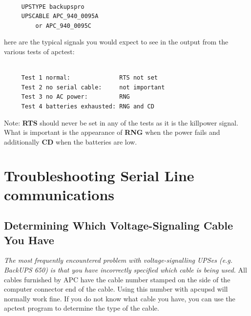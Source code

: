 {{{{{{{{{{\footnotesize
\begin{verbatim}
     
     UPSTYPE backupspro
     UPSCABLE APC_940_0095A
         or APC_940_0095C
\end{verbatim}
\normalsize

here are the typical signals you would expect to see in the output from the
various tests of apctest: 

\footnotesize
\begin{verbatim}
     
     Test 1 normal:              RTS not set
     Test 2 no serial cable:     not important
     Test 3 no AC power:         RNG
     Test 4 batteries exhausted: RNG and CD
\end{verbatim}
\normalsize

Note: {\bf RTS} should never be set in any of the tests as it is the killpower
signal. What is important is the appearance of {\bf RNG} when the power fails
and additionally {\bf CD} when the batteries are low. 

\label{Troubleshooting-Serial-Line-communications}

\section*{Troubleshooting Serial Line communications}

\label{index-Problems_002c-Serial-228}
\label{index-Serial-Problems-229}

\label{Determining-Which-Voltage_002dSignaling-Cable-You-Have}

\subsection*{Determining Which Voltage-Signaling Cable You Have}

{\it The most frequently encountered problem with voltage-signalling UPSes
(e.g. BackUPS 650) is that you have incorrectly specified which cable is being
used.} All cables furnished by APC have the cable number stamped on the side
of the computer connector end of the cable. Using this number with apcupsd
will normally work fine. If you do not know what cable you have, you can use
the apctest program to determine the type of the cable.  

}}}}}}}}}}
